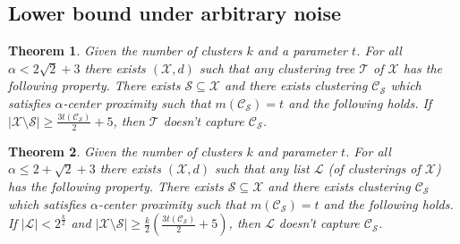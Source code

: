 \documentclass[letterpaper,12pt,titlepage,oneside,final]{book}
\newtheorem{theorem}{Theorem}
\newcommand{\mc}{\mathcal}
\begin{document}
\subsection{Lower bound under arbitrary noise}
\label{section:alphaLowerBoundArbitrary}

\begin{theorem}
\label{thm:nosparsealg}
Given the number of clusters $k$ and a parameter $t$. For all $\alpha < 2\sqrt 2 + 3$ there exists $(\mc X, d)$ such that any clustering tree $\mc T$ of $\mc X$ has the following property. There exists $\mc S \subseteq \mc X$ and there exists clustering $\mc C_{\mc S}$ which satisfies $\alpha$-center proximity such that $m(\mc C_{\mc S}) = t$ and the following holds. If $|\mc X \setminus \mc S| \ge \frac{3t(\mc C_{\mc S})}{2}+5$, then $\mc T$ doesn't capture $\mc C_{\mc S}$.
\end{theorem}

\begin{theorem}
\label{thm:nosparselistalphacp}
Given the number of clusters $k$ and parameter $t$. For all $\alpha \le 2+\sqrt{2}+3$ there exists $(\mc X, d)$ such that any list $\mc L$ (of clusterings of $\mc X$) has  the following property. There exists $\mc S \subseteq \mc X$ and there exists clustering $\mc C_{\mc S}$ which satisfies $\alpha$-center proximity such that $m(\mc C_{\mc S}) = t$ and the following holds. If $|\mc L| < 2^{\frac{k}{2}}$ and $|\mc X \setminus \mc S|\ge \frac{k}{2}(\frac{3t(\mc C_{\mc S})}{2}+5)$, then $\mc L$ doesn't capture $\mc C_{\mc S}$.
\end{theorem}
\end{document}
